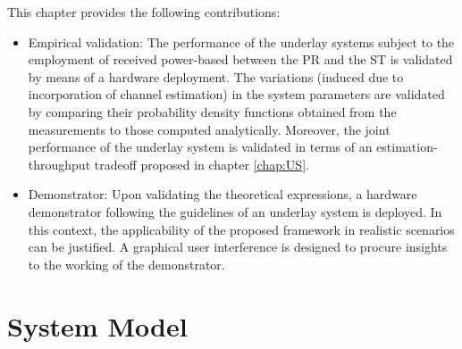 This chapter provides the following contributions:
\begin{itemize}
	\item Empirical validation: The performance of the underlay systems subject to the employment of received power-based between the PR and the ST is validated by means of a hardware deployment. The variations (induced due to incorporation of channel estimation) in the system parameters are validated by comparing their probability density functions obtained from the measurements to those computed analytically. Moreover, the joint performance of the underlay system is validated in terms of an estimation-throughput tradeoff proposed in chapter \ref{chap:US}. %
	\item Demonstrator: Upon validating the theoretical expressions, a hardware demonstrator following the guidelines of an underlay system is deployed. In this context, the applicability of the proposed framework in realistic scenarios can be justified. A graphical user interference is designed to procure insights to the working of the demonstrator.	
\end{itemize}



\section{System Model}
\label{sysmod}

